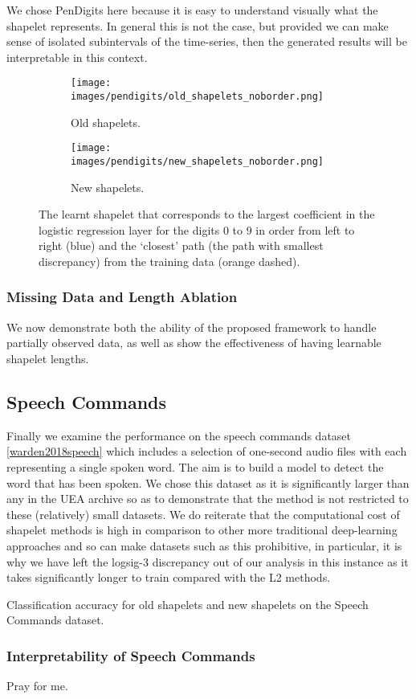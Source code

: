 We chose PenDigits here because it is easy to understand visually what the shapelet represents. In general this is not the case, but provided we can make sense of isolated subintervals of the time-series, then the generated results will be interpretable in this context.
\begin{figure}[ht]
    \begin{subfigure}[b]{\linewidth}
        \centering
        \texttt{[image: images/pendigits/old\_shapelets\_noborder.png]}
        \caption{Old shapelets.}
        \label{fig:old_shapelets}
    \end{subfigure}
    \vspace{0.1}
    \begin{subfigure}[b]{\linewidth}
        \centering
        \texttt{[image: images/pendigits/new\_shapelets\_noborder.png]}
        \caption{New shapelets.}
        \label{fig:new_shapelets}
    \end{subfigure}
    \caption{The learnt shapelet that corresponds to the largest coefficient in the logistic regression layer for the digits 0 to 9 in order from left to right (blue) and the `closest' path (the path with smallest discrepancy) from the training data (orange dashed).}
    \label{fig:pendigits}
\end{figure}


\subsubsection{Missing Data and Length Ablation}
We now demonstrate both the ability of the proposed framework to handle partially observed data, as well as show the effectiveness of having learnable shapelet lengths.
\begin{table}[ht]
    \caption{}
    \label{tab:uea_noise}
    \centering
    
\end{table}


\subsection{Speech Commands}
Finally we examine the performance on the speech commands dataset \ref{warden2018speech} which includes a selection of one-second audio files with each representing a single spoken word. The aim is to build a model to detect the word that has been spoken. We chose this dataset as it is significantly larger than any in the UEA archive so as to demonstrate that the method is not restricted to these (relatively) small datasets. We do reiterate that the computational cost of shapelet methods is high in comparison to other more traditional deep-learning approaches and so can make datasets such as this prohibitive, in particular, it is why we have left the logsig-3 discrepancy out of our analysis in this instance as it takes significantly longer to train compared with the L2 methods.
\begin{table}[ht]
    \caption{Classification accuracy for old shapelets and new shapelets on the Speech Commands dataset.}
    \label{tab:speech_commands}
    \centering
    
\end{table}

\subsubsection{Interpretability of Speech Commands}
Pray for me.

